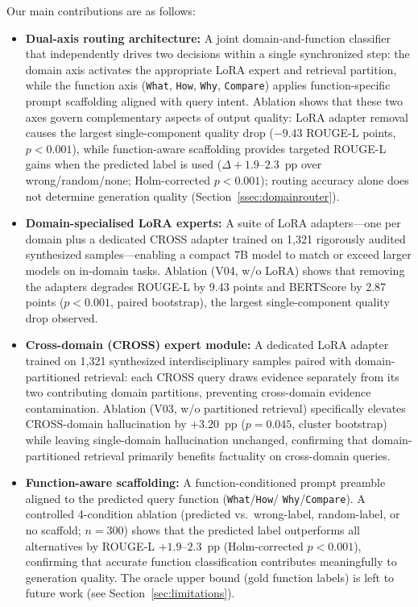 \documentclass[a4paper,fleql]{cas-sc}
\begin{document}
Our main contributions are as follows:
\begin{itemize}
    \item \textbf{Dual-axis routing architecture:} A joint domain-and-function
    classifier that independently drives two decisions within a single synchronized
    step: the domain axis activates the appropriate LoRA expert and retrieval partition,
    while the function axis (\texttt{What}, \texttt{How}, \texttt{Why}, \texttt{Compare})
    applies function-specific prompt scaffolding aligned with query intent.
    Ablation shows that these two axes govern complementary aspects of output quality:
    LoRA adapter removal causes the largest single-component quality drop
    ($-9.43$ ROUGE-L points, $p{<}0.001$), while function-aware scaffolding provides
    targeted ROUGE-L gains when the predicted label is used
    ($\Delta{+}1.9$--$2.3$~pp over wrong/random/none; Holm-corrected $p{<}0.001$);
    routing accuracy alone does not determine generation quality
    (Section~\ref{ssec:domainrouter}).

    \item \textbf{Domain-specialised LoRA experts:} A suite of LoRA adapters---one
    per domain plus a dedicated CROSS adapter trained on 1,321 rigorously audited
    synthesized samples---enabling a compact 7B model to match or exceed larger
    models on in-domain tasks. Ablation (V04, w/o LoRA) shows that removing the
    adapters degrades ROUGE-L by 9.43 points and BERTScore by 2.87 points
    ($p{<}0.001$, paired bootstrap), the largest single-component quality drop observed.

    \item \textbf{Cross-domain (CROSS) expert module:} A dedicated LoRA adapter
    trained on 1,321 synthesized interdisciplinary samples paired with
    domain-partitioned retrieval: each CROSS query draws evidence separately
    from its two contributing domain partitions, preventing cross-domain
    evidence contamination. Ablation (V03, w/o partitioned retrieval) specifically
    elevates CROSS-domain hallucination by $+3.20$~pp ($p{=}0.045$, cluster bootstrap)
    while leaving single-domain hallucination unchanged, confirming that
    domain-partitioned retrieval primarily benefits factuality on cross-domain queries.

    \item \textbf{Function-aware scaffolding:} A function-conditioned prompt
    preamble aligned to the predicted query function (\texttt{What}/\texttt{How}/%
    \texttt{Why}/\texttt{Compare}). A controlled 4-condition ablation (predicted vs.\
    wrong-label, random-label, or no scaffold; $n{=}300$) shows that the predicted
    label outperforms all alternatives by ROUGE-L $+1.9$--$2.3$~pp
    (Holm-corrected $p{<}0.001$), confirming that accurate function classification
    contributes meaningfully to generation quality. The oracle upper bound
    (gold function labels) is left to future work (see Section~\ref{sec:limitations}).


\end{itemize}
\end{document}
